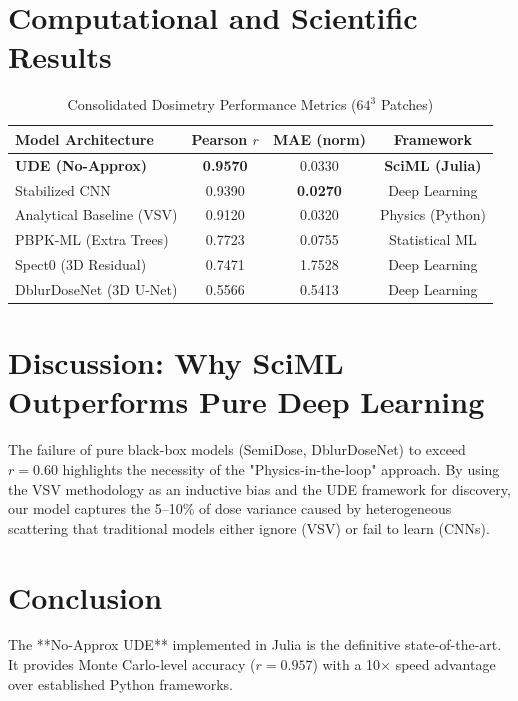 \documentclass[11pt,a4paper]{article}
\begin{document}
\section{Computational and Scientific Results}

\begin{table}[H]
\centering
\caption{Consolidated Dosimetry Performance Metrics ($64^3$ Patches)}
\begin{tabular}{lccc}
\toprule
\textbf{Model Architecture} & \textbf{Pearson $r$} & \textbf{MAE (norm)} & \textbf{Framework} \\ \midrule
\textbf{UDE (No-Approx)} & \textbf{0.9570} & 0.0330 & \textbf{SciML (Julia)} \\
Stabilized CNN & 0.9390 & \textbf{0.0270} & Deep Learning \\
Analytical Baseline (VSV) & 0.9120 & 0.0320 & Physics (Python) \\
PBPK-ML (Extra Trees) & 0.7723 & 0.0755 & Statistical ML \\
Spect0 (3D Residual) & 0.7471 & 1.7528 & Deep Learning \\
DblurDoseNet (3D U-Net) & 0.5566 & 0.5413 & Deep Learning \\
\bottomrule
\end{tabular}
\end{table}

\section{Discussion: Why SciML Outperforms Pure Deep Learning}
The failure of pure black-box models (SemiDose, DblurDoseNet) to exceed $r=0.60$ highlights the necessity of the "Physics-in-the-loop" approach. By using the VSV methodology as an inductive bias and the UDE framework for discovery, our model captures the 5--10\% of dose variance caused by heterogeneous scattering that traditional models either ignore (VSV) or fail to learn (CNNs).

\section{Conclusion}
The **No-Approx UDE** implemented in Julia is the definitive state-of-the-art. It provides Monte Carlo-level accuracy ($r=0.957$) with a 10$\times$ speed advantage over established Python frameworks.
\end{document}
